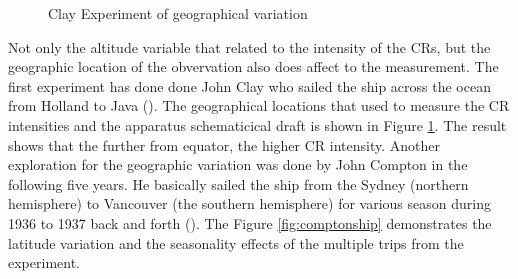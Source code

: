 \begin{figure}[h!]
    \centering
        \hfill
        \caption{Clay Experiment of geographical variation}
       \label{fig:clay_cr_ship}
\end{figure}

Not only the altitude variable that related to the 
intensity of the CRs, but the geographic location of the 
obvervation also does affect to the measurement.
The first experiment has done done John Clay who
sailed the ship across the ocean from Holland to Java
(\cite{Clay1927,Clay1928}). The geographical locations 
that used to measure the CR intensities and the 
apparatus schematicical draft is shown in Figure
\ref{fig:clay_cr_ship}. The result shows that
the further from equator, the higher CR intensity.
Another exploration for the geographic variation was 
done by John Compton in the following five years.
He basically sailed the ship from the Sydney (northern hemisphere)
to Vancouver (the southern hemisphere) for various season
during 1936 to 1937 back and forth (\cite{compton1937cosmic}).
The Figure \ref{fig:comptonship} demonstrates the 
latitude variation and the seasonality effects of the 
multiple trips from the experiment.

